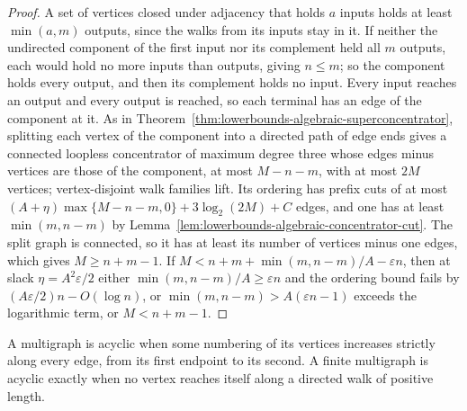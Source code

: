 \begin{proof}
  \leanok
  A set of vertices closed under adjacency that holds $a$ inputs holds at least $\min(a,m)$
  outputs, since the walks from its inputs stay in it. If neither the undirected component of
  the first input nor its complement held all $m$ outputs, each would hold no more inputs than
  outputs, giving $n\le m$; so the component holds every output, and then its complement holds
  no input. Every input reaches an output and every output is reached, so each terminal has an
  edge of the component at it. As in
  Theorem~\ref{thm:lowerbounds-algebraic-superconcentrator}, splitting each vertex of the
  component into a directed path of edge ends gives a connected loopless concentrator of
  maximum degree three whose edges minus vertices are those of the component, at most $M-n-m$,
  with at most $2M$ vertices; vertex-disjoint walk families lift. Its ordering has prefix cuts
  of at most $(A+\eta)\max\{M-n-m,0\}+3\log_2(2M)+C$ edges, and one has at least $\min(m,n-m)$
  by Lemma~\ref{lem:lowerbounds-algebraic-concentrator-cut}. The split graph is connected, so it
  has at least its number of vertices minus one edges, which gives $M\ge n+m-1$. If
  $M<n+m+\min(m,n-m)/A-\varepsilon n$, then at slack $\eta=A^2\varepsilon/2$ either
  $\min(m,n-m)/A\ge\varepsilon n$ and the ordering bound fails by $(A\varepsilon/2)n-O(\log n)$,
  or $\min(m,n-m)>A(\varepsilon n-1)$ exceeds the logarithmic term, or $M<n+m-1$.
\end{proof}

\begin{definition}
  \label{def:lowerbounds-algebraic-acyclic}
  \leanok
  A multigraph is acyclic when some numbering of its vertices increases strictly along every
  edge, from its first endpoint to its second. A finite multigraph is acyclic exactly when no
  vertex reaches itself along a directed walk of positive length.
\end{definition}

